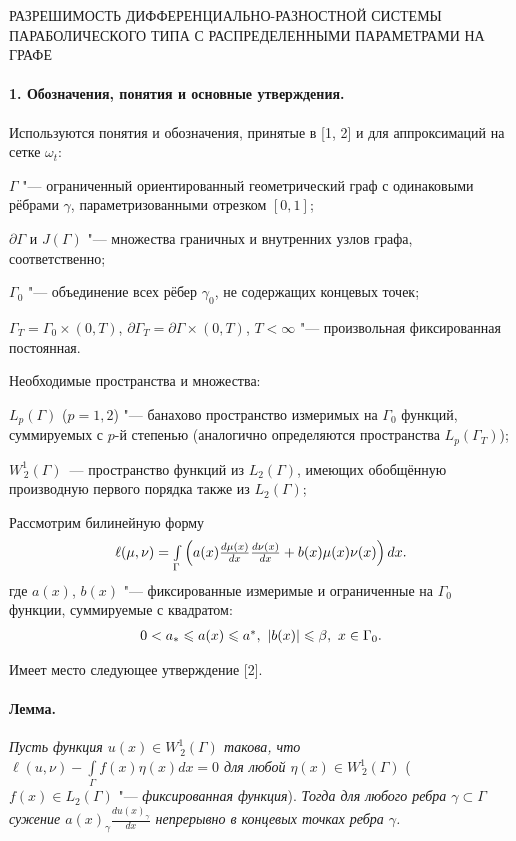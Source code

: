 \vzmstitle
{
	РАЗРЕШИМОСТЬ ДИФФЕРЕНЦИАЛЬНО-РАЗНОСТНОЙ СИСТЕМЫ ПАРАБОЛИЧЕСКОГО ТИПА С РАСПРЕДЕЛЕННЫМИ ПАРАМЕТРАМИ НА ГРАФЕ
}

\vzmscaption

\paragraph{1. Обозначения, понятия и основные утверждения.} Используются понятия и  обозначения, принятые в [1, 2] и для аппроксимаций на сетке  $\omega_t$:

$\Gamma$ "--- ограниченный ориентированный геометрический граф с одинаковыми рёбрами $\gamma$, параметризованными отрезком $[0,1]$;

$\partial\Gamma$ и $J(\Gamma)$ "--- множества граничных и внутренних узлов графа, соответственно;

$\Gamma_0$ "--- объединение всех рёбер $\gamma_0$, не содержащих концевых точек;

$\Gamma_{T}=\Gamma_0\times(0,T)$, $\partial \Gamma_{T}=\partial \Gamma\times(0,T)$, $T<\infty$ "--- произвольная фиксированная постоянная.

Необходимые пространства и множества:

$L_{p}(\Gamma)$ ($p=1,2$) "--- банахово пространство измеримых на $\Gamma_0$ функций, суммируемых с $p$-й степенью (аналогично определяются пространства $L_{p}(\Gamma_T)$);


$W_{\,2}^{1}(\Gamma)$~--- пространство функций из $L_{2}(\Gamma)$, имеющих обобщённую производную первого порядка также из $L_{2}(\Gamma)$;

Рассмотрим билинейную форму
\[
{{\begin{array}{*{20}c}
\ell(\mu,\nu)=\int\limits_{\Gamma}\left(a(x)\frac{d \mu(x)}{d x}\frac{d \nu(x)}{d x}+b(x)\mu(x)\nu(x)\right)dx.
 \end{array} }}
\]
где $a(x)$, $b(x)$ "--- фиксированные измеримые и ограниченные на $\Gamma_0$ функции, суммируемые с квадратом:
\begin{equation}\label{eq1}
{{\begin{array}{*{20}c}
0<a_\ast\leqslant a(x)\leqslant a^\ast,\,\,|b(x)|\leqslant \beta,\,\,x\in \Gamma_0.
 \end{array} }}
\end{equation}

Имеет место следующее утверждение [2].

\paragraph{Лемма.} \emph{Пусть функция $u(x)\in W^1_{\,2}(\Gamma)$ такова, что $\ell(u,\nu)-\int\limits_{\Gamma}f(x)\eta(x)dx=0$ для любой $\eta(x)\in W^1_{\,2}(\Gamma)$} ($f(x)\in L_2(\Gamma)$ "--- \emph{фиксированная функция}). \emph{Тогда для любого ребра $\gamma\subset\Gamma$ сужение $a(x)_\gamma\frac{du(x)_\gamma}{dx}$ непрерывно в концевых точках ребра $\gamma$.}


